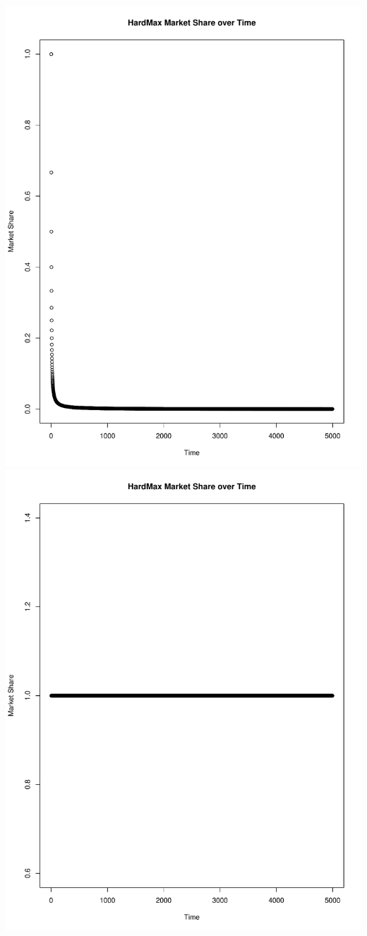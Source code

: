 \documentclass[11pt,letterpaper]{article}
\begin{document}
\includegraphics[scale=0.30]{decreasing_ms_over_time} \\
\includegraphics[scale=0.30]{standard_ms_over_time} \\
\vspace{0.25cm}
\end{document}
